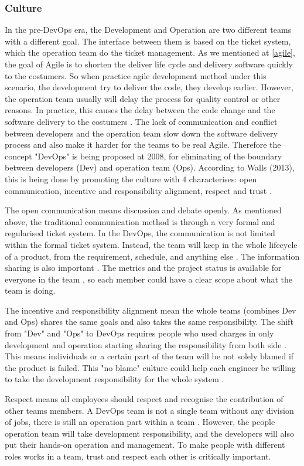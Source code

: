 \subsubsection[]{Culture}
In the pre-DevOps era, the Development and Operation are two different teams with a different goal. The interface between them is based on the ticket system, which the operation team do the ticket management. As we mentioned at \ref{agile}, the goal of Agile is to shorten the deliver life cycle and delivery software quickly to the costumers. So when practice agile development method under this scenario, the development try to deliver the code, they develop earlier. However, the operation team usually will delay the process for quality control or other reasons. In practice, this causes the delay between the code change and the software delivery to the costumers \cite{leite2019survey}. 
The lack of communication and conflict between developers and the operation team slow down the software delivery process and also make it harder for the teams to be real Agile. Therefore the concept "DevOps" is being proposed at 2008, for eliminating of the boundary between developers (Dev) and operation team (Ops). According to Walls (2013), this is being done by promoting the culture with 4 characterises: open communication, incentive and responsibility alignment, respect and trust \cite{walls2013building}.
\par 
The open communication means discussion and debate openly. As mentioned above, the traditional communication method is through a very formal and regularised ticket system. In the DevOps, the communication is not limited within the formal ticket system. Instead, the team will keep in the whole lifecycle of a product, from the requirement, schedule, and anything else \cite{walls2013building}. The information sharing is also important \cite{lwakatare2015dimensions}. The metrics and the project status is available for everyone in the team \label{moniter}, so each member could have a clear scope about what the team is doing.
\par
The incentive and responsibility alignment mean the whole teams (combines Dev and Ops) shares the same goals and also takes the same responsibility. The shift from "Dev" and "Ops" to DevOps requires people who used charges in only development and operation starting sharing the responsibility from both side \cite{lwakatare2015dimensions}. This means individuals or a certain part of the team will be not solely blamed if the product is failed. This "no blame" culture could help each engineer be willing to take the development responsibility for the whole system \cite{feitelson2013development}.
\par 
Respect means all employees should respect and recognise the contribution of other teams members. A DevOps team is not a single team without any division of jobs, there is still an operation part within a team \cite{TheresNo86:online}. However, the people operation team will take development responsibility, and the developers will also put their hands-on operation and management\cite{shropshire2017uncertainty}. To make people with different roles works in a team, trust and respect each other is critically important. 
